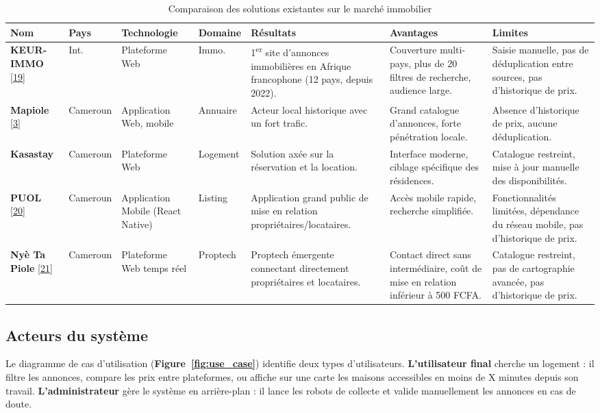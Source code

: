 \begin{table}[H]
    \centering
    \footnotesize
    \renewcommand{\arraystretch}{1.4}
    \begin{tabularx}{\textwidth}{|l|l|p{2.1cm}|l|X|X|X|}
        \hline
        \rowcolor{headergray}
        \textbf{Nom} & \textbf{Pays} & \textbf{Technologie} & \textbf{Domaine} & \textbf{R\'esultats} & \textbf{Avantages} & \textbf{Limites} \\ \hline
        \textbf{KEUR-IMMO} \hyperref[ref:keurimmo]{[19]} & Int. & Plateforme Web & Immo. & 1\textsuperscript{er} site d'annonces immobili\`eres en Afrique francophone (12 pays, depuis 2022). & Couverture multi-pays, plus de 20 filtres de recherche, audience large. & Saisie manuelle, pas de d\'eduplication entre sources, pas d'historique de prix. \\ \hline
        \textbf{Mapiole} \hyperref[ref:mapiole_app]{[3]} & Cameroun & Application Web, mobile & Annuaire & Acteur local historique avec un fort trafic. & Grand catalogue d'annonces, forte p\'en\'etration locale. & Absence d'historique de prix, aucune d\'eduplication. \\ \hline
        \textbf{Kasastay} & Cameroun & Plateforme Web & Logement & Solution ax\'ee sur la r\'eservation et la location. & Interface moderne, ciblage sp\'ecifique des r\'esidences. & Catalogue restreint, mise \`a jour manuelle des disponibilit\'es. \\ \hline
        \textbf{PUOL} \hyperref[ref:puol]{[20]} & Cameroun & Application Mobile (React Native) & Listing & Application grand public de mise en relation propri\'etaires/locataires. & Acc\`es mobile rapide, recherche simplifi\'ee. & Fonctionnalit\'es limit\'ees, d\'ependance du r\'eseau mobile, pas d'historique de prix. \\ \hline
        \textbf{Ny\`e Ta Piole} \hyperref[ref:nyetapiole]{[21]} & Cameroun & Plateforme Web temps r\'eel & Proptech & Proptech \'emergente connectant directement propri\'etaires et locataires. & Contact direct sans interm\'ediaire, co\^ut de mise en relation inf\'erieur \`a 500 FCFA. & Catalogue restreint, pas de cartographie avanc\'ee, pas d'historique de prix. \\ \hline
    \end{tabularx}
    \caption{Comparaison des solutions existantes sur le march\'e immobilier}
    \label{tab:concurrents_existants}
\end{table}
\vspace{-6pt}
\subsection{Acteurs du syst\`eme}
Le diagramme de cas d'utilisation (\textbf{Figure~\ref{fig:use_case}}) identifie deux types d'utilisateurs. \textbf{L'utilisateur final} cherche un logement : il filtre les annonces, compare les prix entre plateformes, ou affiche sur une carte les maisons accessibles en moins de X minutes depuis son travail. \textbf{L'administrateur} g\`ere le syst\`eme en arri\`ere-plan : il lance les robots de collecte et valide manuellement les annonces en cas de doute.

\vspace{-4pt}
